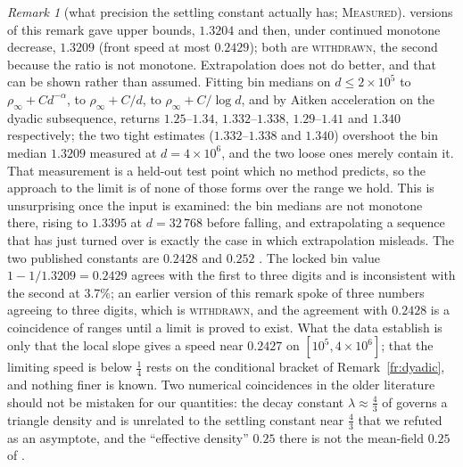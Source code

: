 \documentclass[11pt]{article}
\theoremstyle{definition}
\theoremstyle{remark}
\newtheorem{remark}[theorem]{Remark}
\newcommand{\MEASURED}{\textsc{Measured}}
\begin{document}
\begin{remark}[what precision the settling constant actually has; \MEASURED]
versions of this remark gave upper bounds, $1.3204$ and then, under continued monotone decrease, $1.3209$ (front speed at
most $0.2429$); both are \textsc{withdrawn}, the second because the ratio is not monotone.
Extrapolation does not do better, and that can be shown rather than
assumed. Fitting bin medians on $d\le2\times10^{5}$ to $\rho_\infty+Cd^{-\alpha}$, to
$\rho_\infty+C/d$, to $\rho_\infty+C/\log d$, and by Aitken acceleration on the dyadic subsequence,
returns $1.25$--$1.34$, $1.332$--$1.338$, $1.29$--$1.41$ and $1.340$ respectively; the two tight estimates
($1.332$--$1.338$ and $1.340$) overshoot the bin median $1.3209$ measured at $d=4\times10^{6}$, and the two loose ones merely
contain it. That measurement is a held-out test point which no method predicts, so the approach to the limit is of none of
those forms over the range we hold. This is unsurprising once the input is examined: the bin medians are not
monotone there, rising to $1.3395$ at $d=32\,768$ before falling, and extrapolating a sequence that has
just turned over is exactly the case in which extrapolation misleads. The two published constants are $0.2428$ \cite[p.~949]{NKS} and $0.252$ \cite[p.~871]{NKS}. The locked bin value
$1-1/1.3209=0.2429$ agrees with the first to three digits and is inconsistent with the second at $3.7\%$; an
earlier version of this remark spoke of three numbers agreeing to three digits, which is \textsc{withdrawn}, and the
agreement with $0.2428$ is a coincidence of ranges until a limit is proved to exist. What the data establish is only that
the local slope gives a speed near $0.2427$ on $[10^{5},4\times10^{6}]$; that the limiting speed is below $\tfrac14$ rests on the
conditional bracket of Remark~\ref{fr:dyadic}, and nothing finer is known. Two numerical
coincidences in the older literature should not be mistaken for our quantities: the decay constant
$\lambda\approx\tfrac43$ of \cite{W83} governs a triangle density and is unrelated to the settling
constant near $\tfrac43$ that we refuted as an asymptote, and the ``effective density'' $0.25$ there is
not the mean-field $0.25$ of \cite[p.~949]{NKS}.
\end{remark}
\end{document}

